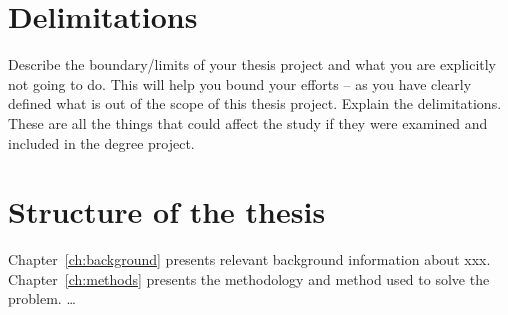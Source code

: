 \section{Delimitations}
Describe the boundary/limits of your thesis project and what you are explicitly not going to do. This will help you bound your efforts – as you have clearly defined what is out of the scope of this thesis project. Explain the delimitations. These are all the things that could affect the study if they were examined and included in the degree project.

\section{Structure of the thesis}
Chapter~\ref{ch:background} presents relevant background information about xxx.  Chapter~\ref{ch:methods} presents the methodology and method used to solve the problem. …
